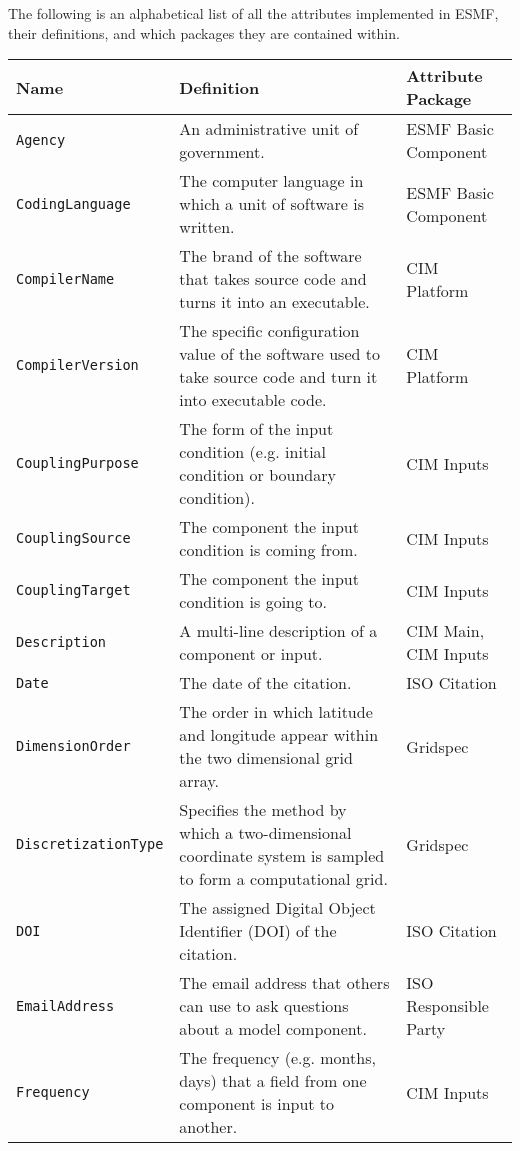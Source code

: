 The following is an alphabetical list of all the attributes implemented in ESMF, their definitions, and which packages they are contained within. 

\noindent

\begin{longtable}{|p{7cm}|p{5cm}|p{15mm}|}
     \hline\hline
     {\bf Name} & {\bf Definition} & {\bf Attribute Package}\\
     \hline\hline
     {\tt Agency} & An administrative unit of government.& ESMF Basic Component\\
     {\tt CodingLanguage} & The computer language in which a unit of software is written. & ESMF Basic Component\\
     {\tt CompilerName} & The brand of the software that takes source code and turns it into an executable.& CIM Platform\\
     {\tt CompilerVersion} & The specific configuration value of the software used to take source code and turn it into executable code. & CIM Platform\\
     {\tt CouplingPurpose} & The form of the input condition (e.g. initial condition or boundary condition). &  CIM Inputs \\
     {\tt CouplingSource} & The component the input condition is coming from. & CIM Inputs\\ 
     {\tt CouplingTarget} & The component the input condition is going to. & CIM Inputs\\ 
     {\tt Description} & A multi-line description of a component or input. & CIM Main, CIM Inputs \\
     {\tt Date} & The date of the citation. & ISO Citation\\
     {\tt DimensionOrder} & The order in which latitude and longitude appear within the two dimensional grid array. & Gridspec\\ 
     {\tt DiscretizationType} & Specifies the method by which a two-dimensional coordinate system is sampled to form a computational grid.& Gridspec \\
     {\tt DOI} & The assigned Digital Object Identifier (DOI) of the citation. & ISO Citation\\
     {\tt EmailAddress} & The email address that others can use to ask questions about a model component. & ISO Responsible Party\\
     {\tt Frequency} & The frequency (e.g. months, days) that a field from one component is input to another. & CIM Inputs\\ 

\end{longtable}
